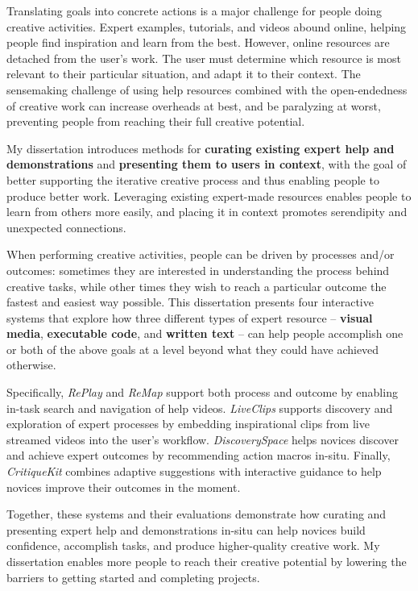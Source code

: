 Translating goals into concrete actions is a major challenge for people doing creative activities. Expert examples, tutorials, and videos abound online, helping people find inspiration and learn from the best. However, online resources are detached from the user’s work. The user must determine which resource is most relevant to their particular situation, and adapt it to their context. The sensemaking challenge of using help resources combined with the open-endedness of creative work can increase overheads at best, and be paralyzing at worst, preventing people from reaching their full creative potential.

My dissertation introduces methods for \textbf{curating existing expert help and demonstrations} and \textbf{presenting them to users in context}, with the goal of better supporting the iterative creative process and thus enabling people to produce better work. Leveraging existing expert-made resources enables people to learn from others more easily, and placing it in context promotes serendipity and unexpected connections.

When performing creative activities, people can be driven by processes and/or outcomes: sometimes they are interested in understanding the process behind creative tasks, while other times they wish to reach a particular outcome the fastest and easiest way possible. This dissertation presents four interactive systems that explore how three different types of expert resource -- \textbf{visual media}, \textbf{executable code}, and \textbf{written text} -- can help people accomplish one or both of the above goals at a level beyond what they could have achieved otherwise.

Specifically, \textit{RePlay} and \textit{ReMap} support both process and outcome by enabling in-task search and navigation of help videos. \textit{LiveClips} supports discovery and exploration of expert processes by embedding inspirational clips from live streamed videos into the user’s workflow. \textit{DiscoverySpace} helps novices discover and achieve expert outcomes by recommending action macros in-situ. Finally, \textit{CritiqueKit} combines adaptive suggestions with interactive guidance to help novices improve their outcomes in the moment.

Together, these systems and their evaluations demonstrate how curating and presenting expert help and demonstrations in-situ can help novices build confidence, accomplish tasks, and produce higher-quality creative work. My dissertation enables more people to reach their creative potential by lowering the barriers to getting started and completing projects.
